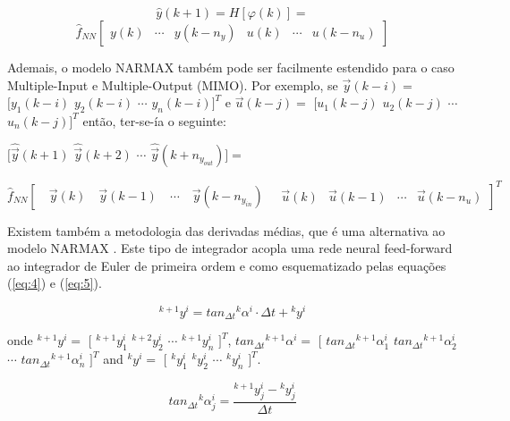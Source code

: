 \documentclass[journal,article,submit,pdftex,moreauthors]{Definitions/mdpi}
\begin{document}
$$ \hat{y}(k+1)=H[\varphi (k)]= $$
\begin{equation}
	\hat{f}_{NN}
	\begin{bmatrix} y(k) & \cdots & y(k-n_y) & u(k) & \cdots & u(k-n_u)
	\end{bmatrix}
	\label{eq:2}
\end{equation}

Ademais, o modelo NARMAX também pode ser facilmente estendido para o caso Multiple-Input e Multiple-Output (MIMO). Por exemplo, se $ \vec{y}(k-i)= $ $ [y_1(k-i) $ $ y_2(k-i) $ $ \cdots $ $ y_n(k-i)]^T $ e $ \vec{u}(k-j )= $ $ [u_1(k-j) $ $ u_2(k-j) $ $ \cdots $ $ u_n(k-j)]^T $ então,  ter-se-ía o seguinte:

\begin{center}
	$ [\hat{\vec{y}}(k+1) $ $ \hat{\vec{y}}(k+2) $ $ \cdots $ $ \hat{\vec{y}}(k+n_{y_{out }})]= $
\end{center}
\begin{equation}
	\hat{f}_{NN}[\quad \vec{y}(k) \quad \vec{y}(k-1) \quad \cdots \quad \vec{y}(k-n_{y_{in}}) \quad  
	\begin{matrix}
		\vec{u}(k) & \vec{u}(k-1) & \cdots & \vec{u}(k-n_{u})
	\end{matrix}]^T
	\label{eq:3}
\end{equation}

Existem também a metodologia das derivadas médias, que é uma alternativa ao modelo NARMAX \cite{ref7, ref8, ref9}. Este tipo de integrador acopla uma rede neural feed-forward ao integrador de Euler de primeira ordem e como esquematizado pelas equações (\ref{eq:4}) e (\ref{eq:5}).

\begin{equation}
{^{k + 1}y^i} = tan_{\Delta t} {^{k}\alpha^i} \cdot \Delta t + {^{k}y^i}
\label{eq:4}
\end{equation}

\noindent onde $ {^{k + 1}y^i}= $ $ [ $ $ {^{k + 1}y_1^i} $ $ {^{k + 2}y_2^i} $ $ \cdots $ $ {^{k + 1}y_n^i} $ $ ]^T $, $ tan_{\Delta t} {^{k + 1} \alpha^i}= $ $ [ $ $ tan_{\Delta t} {^{k + 1} \alpha_1^i} $ $ tan_{\Delta t} {^{k + 1} \alpha_2^i} $ $ \cdots $ $ tan_{\Delta t} {^{k + 1 } \alpha_n^i} $ $ ]^T$ and $ {^{k }y^i}= $ $ [ $ $ {^{k}y_1^i} $ $ {^{k}y_2^i} $ $ \cdots $ $ {^{k}y_n^i} $ $ ]^T $.

\begin{equation}
   tan_{\Delta t} {^{k}\alpha_j^i} = \frac{{^{k+1}y_j^i}-{^{k}y_j^i}}{\Delta t}
\label{eq:5}
\end{equation}
\end{document}
